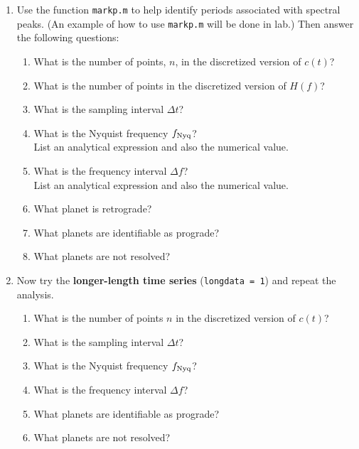 \documentclass[11pt,titlepage,fleqn]{article}
\begin{document}
\begin{spacing}{2.0}
\begin{enumerate}

\item  Use the function \verb+markp.m+ to help identify periods associated with spectral peaks. (An example of how to use \verb+markp.m+ will be done in lab.) Then answer the following questions:
%
\begin{enumerate}
\item What is the number of points, $n$, in the discretized version of $c(t)$?
\item What is the number of points in the discretized version of $H(f)$?
\item What is the sampling interval $\Delta t$?
\item What is the Nyquist frequency $f_{\rm Nyq}$? \\
List an analytical expression and also the numerical value.
\item What is the frequency interval $\Delta f$? \\
List an analytical expression and also the numerical value.
\item What planet is retrograde?
\item What planets are identifiable as prograde?
\item What planets are not resolved?
\end{enumerate}

\item Now try the {\bf longer-length time series} (\verb+longdata = 1+) and repeat the analysis.
%
\begin{enumerate}
\item What is the number of points $n$ in the discretized version of $c(t)$?
\item What is the sampling interval $\Delta t$?
\item What is the Nyquist frequency $f_{\rm Nyq}$?
\item What is the frequency interval $\Delta f$?
\item What planets are identifiable as prograde?
\item What planets are not resolved?
\end{enumerate}

\end{enumerate}

\end{spacing}

%
%

\end{document}
